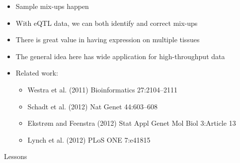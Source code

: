 \documentclass[12pt]{article}
\newcommand{\headsize}{\fontsize{35}{35} \selectfont}
\newcommand{\smallersize}{\fontsize{20}{25} \selectfont}
\newcommand{\smallestsize}{\fontsize{18}{22} \selectfont}
\begin{document}
\vspace{3cm} \color{mywhite} \smallersize

\hfill \begin{minipage}{10in}

\begin{itemize}
\itemsep24pt

\item Sample mix-ups happen


\item With eQTL data, we can both identify and {\color{mypink}
  correct} mix-ups

\item There is great value in having expression on multiple tissues

\item The general idea here has wide application for high-throughput data

\item Related work:

\smallestsize \color{myblue}
\begin{itemize}
\item Westra et al. (2011) Bioinformatics 27:2104--2111
\item Schadt et al. (2012) Nat Genet 44:603--608
\item Ekstr{\o}m and Feenstra (2012) Stat Appl Genet Mol Biol
  3:Article 13
\item Lynch et al. (2012) PLoS ONE 7:e41815
\end{itemize}

\end{itemize}
\end{minipage}



\newpage

\headsize \color{myyellow}
\hfill \begin{minipage}{5.75in}
\centering
Lessons
\end{minipage}

\vspace{20mm} \color{mywhite} \smallersize
\end{document}
